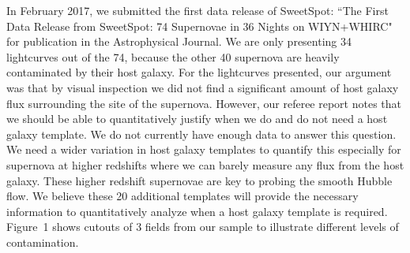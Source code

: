 \documentclass[11pt]{article}
\begin{document}
In February 2017, we submitted the first data release of SweetSpot: ``The First Data Release from SweetSpot: 74 Supernovae in 36 Nights on WIYN+WHIRC"\cite{weyant17} for publication in the Astrophysical Journal. 
We are only presenting 34 lightcurves out of the 74, because the other 40 supernova are heavily contaminated by their host galaxy. 
For the lightcurves presented, our argument was that by visual inspection we did not find a significant amount of host galaxy flux surrounding the site of the supernova.
However, our referee report notes that we should be able to quantitatively justify when we do and do not need a host galaxy template. 
We do not currently have enough data to answer this question. 
We need a wider variation in host galaxy templates to quantify this especially for supernova at higher redshifts where we can barely measure any flux from the host galaxy.
These higher redshift supernovae are key to probing the smooth Hubble flow.
We believe these 20 additional templates will provide the necessary information to quantitatively analyze when a host galaxy template is required. 
Figure~1 shows cutouts of 3 fields from our sample to illustrate different levels of contamination.  
\end{document}
